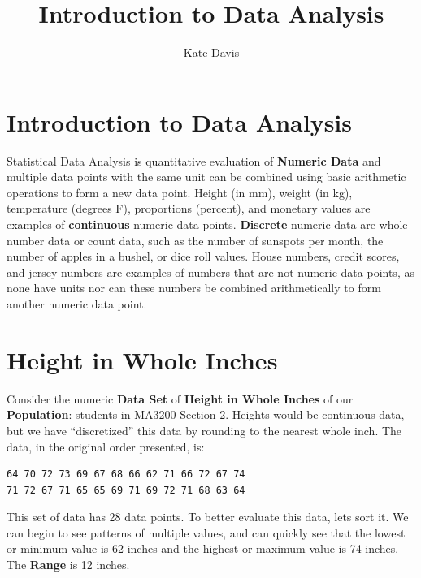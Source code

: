 \documentclass[nohyper,justified]{tufte-handout}\usepackage[]{graphicx}\usepackage[]{color}
\title{Introduction to Data Analysis}
\author{Kate Davis}
\makeatletter
\newenvironment{kframe}{%
 \def\at@end@of@kframe{}%
 \ifinner\ifhmode%
  \def\at@end@of@kframe{\end{minipage}}%
  \begin{minipage}{\columnwidth}%
 \fi\fi%
 \def\FrameCommand##1{\hskip\@totalleftmargin \hskip-\fboxsep
 \colorbox{shadecolor}{##1}\hskip-\fboxsep
     \hskip-\linewidth \hskip-\@totalleftmargin \hskip\columnwidth}%
 \MakeFramed {\advance\hsize-\width
   \@totalleftmargin\z@ \linewidth\hsize
   \@setminipage}}%
 {\par\unskip\endMakeFramed%
 \at@end@of@kframe}
\newenvironment{knitrout}{}{} %
\makeatother
\begin{document}
\maketitle
\section{Introduction to Data Analysis}
Statistical Data Analysis is quantitative evaluation of \textbf{Numeric Data} and multiple data points with the same unit can be combined using basic arithmetic operations to form a new data point. Height (in mm), weight (in kg), temperature (degrees F), proportions (percent), and monetary values are examples of  \textbf{continuous} numeric data points. \textbf{Discrete} numeric data are whole number data or count data, such as the number of sunspots per month, the number of apples in a bushel, or dice roll values.  House numbers, credit scores, and jersey numbers are examples of numbers that are not numeric data points, as none have units nor can these numbers be combined arithmetically to form another numeric data point.

\section{Height in Whole Inches}
Consider the numeric \textbf{Data Set} of \textbf{Height in Whole Inches} of our \textbf{Population}: students in MA3200 Section 2. Heights would be continuous data, but we have ``discretized'' this data by rounding to the nearest whole inch. The data, in the original order presented, is:

\begin{knitrout}
\color{fgcolor}\begin{kframe}
\begin{verbatim}
64 70 72 73 69 67 68 66 62 71 66 72 67 74
71 72 67 71 65 65 69 71 69 72 71 68 63 64
\end{verbatim}
\end{kframe}
\end{knitrout}
This set of data has 28 data points. To better evaluate this data, lets sort it. We can begin to see patterns of multiple values, and can quickly see that the lowest or minimum value is 62 inches and the highest or maximum value is 74 inches. The \textbf{Range} is 12 inches.
\end{document}

